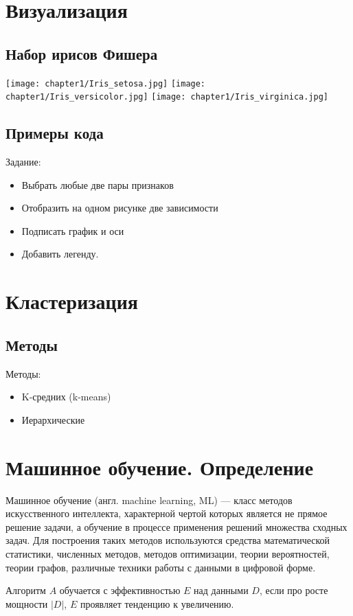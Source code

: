 \section{Визуализация}
\subsection{Набор ирисов Фишера}

\begin{multicols}{3}
	
\texttt{[image: chapter1/Iris\_setosa.jpg]} %
\texttt{[image: chapter1/Iris\_versicolor.jpg]} %
\texttt{[image: chapter1/Iris\_virginica.jpg]} %
\end{multicols}
    
\subsection{Примеры кода}

Задание:
\begin{itemize}
    \item Выбрать любые две пары признаков
    \item Отобразить на одном рисунке две зависимости
    \item Подписать график и оси
    \item Добавить легенду.
\end{itemize}

\section{Кластеризация}
\subsection{Методы}

Методы:
\begin{itemize}
    \item K-средних (k-means)
    \item Иерархические
\end{itemize}


\section{Машинное обучение. Определение}
Машинное обучение (англ. machine learning, ML) — класс методов искусственного интеллекта, характерной чертой которых является не прямое решение задачи, а обучение в процессе применения решений множества сходных задач. Для построения таких методов используются средства математической статистики, численных методов, методов оптимизации, теории вероятностей, теории графов, различные техники работы с данными в цифровой форме\cite{wiki:ml_def}.

Алгоритм $A$ обучается с эффективностью $E$ над данными $D$, если про росте мощности $|D|$, $E$ проявляет тенденцию к увеличению.
